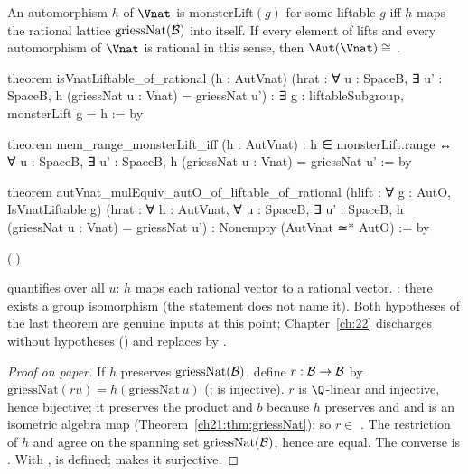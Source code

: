 \begin{theorem}\label{ch21:thm:rational}
An automorphism $h$ of $\Vnat$ is $\mathrm{monsterLift}(g)$ for some liftable $g$ iff $h$ maps the rational
lattice $\mathrm{griessNat}(\mathcal{B})$ into itself.  If every element of  lifts and every
automorphism of $\Vnat$ is rational in this sense, then $\Aut(\Vnat)\cong$ .
\end{theorem}
\begin{leancode}
theorem isVnatLiftable_of_rational (h : AutVnat)
    (hrat : ∀ u : SpaceB, ∃ u' : SpaceB, h (griessNat u : Vnat) = griessNat u') :
    ∃ g : liftableSubgroup, monsterLift g = h := by
\end{leancode}
\begin{leancode}
theorem mem_range_monsterLift_iff (h : AutVnat) :
    h ∈ monsterLift.range ↔ ∀ u : SpaceB, ∃ u' : SpaceB, h (griessNat u : Vnat) = griessNat u' := by
\end{leancode}
\begin{leancode}
theorem autVnat_mulEquiv_autO_of_liftable_of_rational (hlift : ∀ g : AutO, IsVnatLiftable g)
    (hrat : ∀ h : AutVnat, ∀ u : SpaceB, ∃ u' : SpaceB, h (griessNat u : Vnat) = griessNat u') :
    Nonempty (AutVnat ≃* AutO) := by
\end{leancode}
(.)
\begin{dictionary}
 quantifies over all $u$: $h$ maps each rational vector to a rational vector.
: there exists a group isomorphism (the statement does not name it).
Both hypotheses of the last theorem are genuine inputs at this point; Chapter~\ref{ch:22} discharges
 without hypotheses () and replaces  by
.
\end{dictionary}
\begin{proof}[Proof on paper]
If $h$ preserves $\mathrm{griessNat}(\mathcal{B})$, define $r:\mathcal{B}\to\mathcal{B}$ by
$\mathrm{griessNat}(r u)=h(\mathrm{griessNat}\,u)$ (;  is injective).
$r$ is $\Q$-linear and injective, hence bijective; it preserves the product and $b$ because $h$
preserves  and  and  is an isometric algebra map
(Theorem~\ref{ch21:thm:griessNat}); so $r\in$ .  The restriction of $h$ and
 agree on the spanning set $\mathrm{griessNat}(\mathcal{B})$, hence are equal.  The
converse is .  With ,  is defined;
 makes it surjective.
\end{proof}
